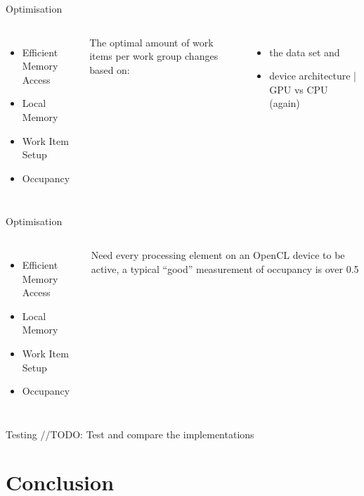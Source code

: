 \documentclass[10pt,aspectratio=169]{beamer} %
\newcommand{\hide}[1] {
	\textcolor{hiddencolor}{#1}
}
\begin{document}
\begin{frame}{Optimisation}

\begin{columns}[onlytextwidth]
\column{\dimexpr\linewidth-85mm-5mm}
\begin{itemize}
\item \hide{Efficient Memory Access}
\item \hide{Local Memory}
\item \alert{Work Item Setup}
\item \hide{Occupancy}
\end{itemize}

\column{85mm}
\large
The optimal amount of work items per work group changes based on:
\begin{itemize}
\item the data set and
\item device architecture | GPU vs CPU (again)
\end{itemize}

\end{columns}
  
\end{frame}

\begin{frame}{Optimisation}

\begin{columns}[onlytextwidth]
\column{\dimexpr\linewidth-85mm-5mm}
\begin{itemize}
\item \hide{Efficient Memory Access}
\item \hide{Local Memory}
\item \hide{Work Item Setup}
\item \alert{Occupancy}
\end{itemize}

\column{85mm}
\large
Need every processing element on an OpenCL device to be active, a typical ``good'' measurement of occupancy is over 0.5
\end{columns}
  
\end{frame}

\begin{frame}{Testing}
//\alert{TODO: Test and compare the implementations }
\end{frame}


\section{Conclusion}
\end{document}

